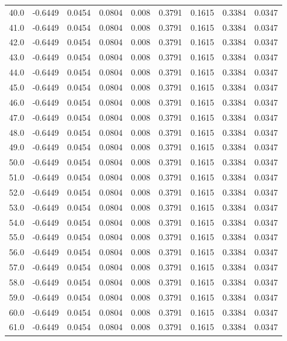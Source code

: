 \begin{longtable}{lrrrrrrrr}
40.0 & -0.6449 & 0.0454 & 0.0804 & 0.008 & 0.3791 & 0.1615 & 0.3384 & 0.0347 \\
41.0 & -0.6449 & 0.0454 & 0.0804 & 0.008 & 0.3791 & 0.1615 & 0.3384 & 0.0347 \\
42.0 & -0.6449 & 0.0454 & 0.0804 & 0.008 & 0.3791 & 0.1615 & 0.3384 & 0.0347 \\
43.0 & -0.6449 & 0.0454 & 0.0804 & 0.008 & 0.3791 & 0.1615 & 0.3384 & 0.0347 \\
44.0 & -0.6449 & 0.0454 & 0.0804 & 0.008 & 0.3791 & 0.1615 & 0.3384 & 0.0347 \\
45.0 & -0.6449 & 0.0454 & 0.0804 & 0.008 & 0.3791 & 0.1615 & 0.3384 & 0.0347 \\
46.0 & -0.6449 & 0.0454 & 0.0804 & 0.008 & 0.3791 & 0.1615 & 0.3384 & 0.0347 \\
47.0 & -0.6449 & 0.0454 & 0.0804 & 0.008 & 0.3791 & 0.1615 & 0.3384 & 0.0347 \\
48.0 & -0.6449 & 0.0454 & 0.0804 & 0.008 & 0.3791 & 0.1615 & 0.3384 & 0.0347 \\
49.0 & -0.6449 & 0.0454 & 0.0804 & 0.008 & 0.3791 & 0.1615 & 0.3384 & 0.0347 \\
50.0 & -0.6449 & 0.0454 & 0.0804 & 0.008 & 0.3791 & 0.1615 & 0.3384 & 0.0347 \\
51.0 & -0.6449 & 0.0454 & 0.0804 & 0.008 & 0.3791 & 0.1615 & 0.3384 & 0.0347 \\
52.0 & -0.6449 & 0.0454 & 0.0804 & 0.008 & 0.3791 & 0.1615 & 0.3384 & 0.0347 \\
53.0 & -0.6449 & 0.0454 & 0.0804 & 0.008 & 0.3791 & 0.1615 & 0.3384 & 0.0347 \\
54.0 & -0.6449 & 0.0454 & 0.0804 & 0.008 & 0.3791 & 0.1615 & 0.3384 & 0.0347 \\
55.0 & -0.6449 & 0.0454 & 0.0804 & 0.008 & 0.3791 & 0.1615 & 0.3384 & 0.0347 \\
56.0 & -0.6449 & 0.0454 & 0.0804 & 0.008 & 0.3791 & 0.1615 & 0.3384 & 0.0347 \\
57.0 & -0.6449 & 0.0454 & 0.0804 & 0.008 & 0.3791 & 0.1615 & 0.3384 & 0.0347 \\
58.0 & -0.6449 & 0.0454 & 0.0804 & 0.008 & 0.3791 & 0.1615 & 0.3384 & 0.0347 \\
59.0 & -0.6449 & 0.0454 & 0.0804 & 0.008 & 0.3791 & 0.1615 & 0.3384 & 0.0347 \\
60.0 & -0.6449 & 0.0454 & 0.0804 & 0.008 & 0.3791 & 0.1615 & 0.3384 & 0.0347 \\
61.0 & -0.6449 & 0.0454 & 0.0804 & 0.008 & 0.3791 & 0.1615 & 0.3384 & 0.0347 \\

\end{longtable}
